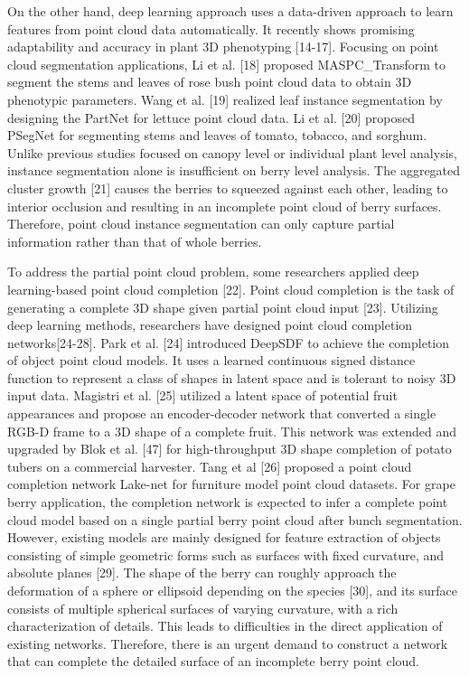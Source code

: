 \documentclass[12pt]{article}
\begin{document}
On the other hand, deep learning approach uses a data-driven approach to learn features from point cloud data automatically. 
It recently shows promising adaptability and accuracy in plant 3D phenotyping [14-17]. Focusing on point cloud segmentation applications, 
Li et al. [18] proposed MASPC\_Transform to segment the stems and leaves of rose bush point cloud data to obtain 3D phenotypic parameters. 
Wang et al. [19] realized leaf instance segmentation by designing the PartNet for lettuce point cloud data. 
Li et al. [20] proposed PSegNet for segmenting stems and leaves of tomato, tobacco, and sorghum. 
Unlike previous studies focused on canopy level or individual plant level analysis, instance segmentation alone is insufficient on berry level analysis. 
The aggregated cluster growth [21] causes the berries to squeezed against each other, leading to interior occlusion and resulting in an incomplete point cloud of berry surfaces. 
Therefore, point cloud instance segmentation can only capture partial information rather than that of whole berries.

To address the partial point cloud problem, some researchers applied deep learning-based point cloud completion [22]. 
Point cloud completion is the task of generating a complete 3D shape given partial point cloud input [23]. 
Utilizing deep learning methods, researchers have designed point cloud completion networks[24-28]. 
Park et al. [24] introduced DeepSDF to achieve the completion of object point cloud models. It uses a learned continuous signed distance function to represent a class of shapes in latent space and is tolerant to noisy 3D input data. 
Magistri et al. [25] utilized a latent space of potential fruit appearances and propose an encoder-decoder network that converted a single RGB-D frame to a 3D shape of a complete fruit. 
This network was extended and upgraded by Blok et al. [47] for high-throughput 3D shape completion of potato tubers on a commercial harvester.
Tang et al [26] proposed a point cloud completion network Lake-net for furniture model point cloud datasets. 
For grape berry application, the completion network is expected to infer a complete point cloud model based on a single partial berry point cloud after bunch segmentation. 
However, existing models are mainly designed for feature extraction of objects consisting of simple geometric forms such as surfaces with fixed curvature, and absolute planes [29]. 
The shape of the berry can roughly approach the deformation of a sphere or ellipsoid depending on the species [30], and its surface consists of multiple spherical surfaces of varying curvature, with a rich characterization of details. 
This leads to difficulties in the direct application of existing networks. 
Therefore, there is an urgent demand to construct a network that can complete the detailed surface of an incomplete berry point cloud.
\end{document}
